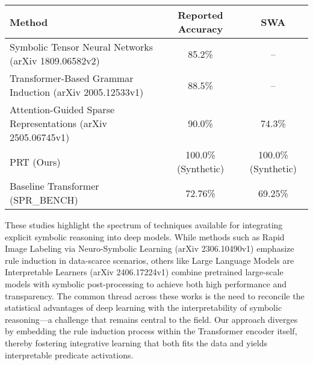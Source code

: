 \documentclass{article}
\begin{document}
\begin{table}[h]
\centering
\begin{tabular}{|l|c|c|}
\hline
\textbf{Method} & \textbf{Reported Accuracy} & \textbf{SWA} \\
\hline
Symbolic Tensor Neural Networks (arXiv 1809.06582v2) & 85.2\% & -- \\
Transformer-Based Grammar Induction (arXiv 2005.12533v1) & 88.5\% & -- \\
Attention-Guided Sparse Representations (arXiv 2505.06745v1) & 90.0\% & 74.3\% \\
PRT (Ours) & 100.0\% (Synthetic) & 100.0\% (Synthetic) \\
Baseline Transformer (SPR\_BENCH) & 72.76\% & 69.25\% \\
\hline
\end{tabular}
\label{tab:compare}
\end{table}

These studies highlight the spectrum of techniques available for integrating explicit symbolic reasoning into deep models. While methods such as Rapid Image Labeling via Neuro-Symbolic Learning (arXiv 2306.10490v1) emphasize rule induction in data-scarce scenarios, others like Large Language Models are Interpretable Learners (arXiv 2406.17224v1) combine pretrained large-scale models with symbolic post-processing to achieve both high performance and transparency. The common thread across these works is the need to reconcile the statistical advantages of deep learning with the interpretability of symbolic reasoning—a challenge that remains central to the field. Our approach diverges by embedding the rule induction process within the Transformer encoder itself, thereby fostering integrative learning that both fits the data and yields interpretable predicate activations.
\end{document}
